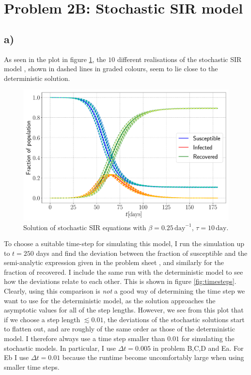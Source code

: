 \section{Problem 2B: Stochastic SIR model}

\subsection{a)}

As seen in the plot in figure \ref{fig:SIR_stoch}, the $10$ different realisations of the stochastic SIR model , shown in dashed lines in graded colours, seem to lie close to the deterministic solution.

\begin{figure}[htb]
	\centering
	\includegraphics[width=0.8\columnwidth]{../fig/2Ba_SIR.pdf}
	\caption{Solution of stochastic SIR equations with $\beta = 0.25\, \mathrm{day}^{-1}$, $\tau = 10\, \mathrm{day}$.}
	\label{fig:SIR_stoch}
\end{figure}

To choose a suitable time-step for simulating this model, I run the simulation up to $t = 250$ days and find the deviation between the fraction of susceptible and the semi-analytic expression given in the problem sheet \cite{sheet}, and similarly for the fraction of recovered. I include the same run with the deterministic model to see how the deviations relate to each other. This is shown in figure \ref{fig:timesteps}. Clearly, using this comparison is \textit{not} a good way of determining the time step we want to use for the deterministic model, as the solution approaches the asymptotic values for all of the step lengths. However, we see from this plot that if we choose a step length $\lesssim 0.01$, the deviations of the stochastic solutions start to flatten out, and are roughly of the same order as those of the deterministic model. I therefore always use a time step smaller than $0.01$ for simulating the stochastic models. In particular, I use $\Delta t = 0.005$ in problem B,C,D and Ea. For Eb I use $\Delta t = 0.01$ because the runtime become uncomfortably large when using smaller time steps.

